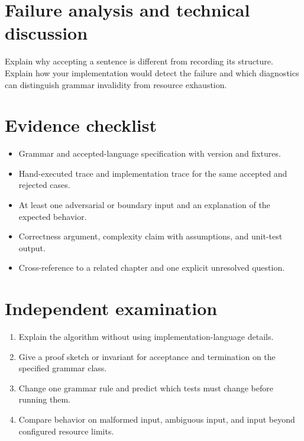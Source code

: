 \documentclass[11pt,letterpaper]{article}
\begin{document}
\section{Failure analysis and technical discussion}
Explain why accepting a sentence is different from recording its structure. Explain how your implementation would detect the failure and which diagnostics can distinguish grammar invalidity from resource exhaustion.
\section{Evidence checklist}
\begin{itemize}
\item Grammar and accepted-language specification with version and fixtures.
\item Hand-executed trace and implementation trace for the same accepted and rejected cases.
\item At least one adversarial or boundary input and an explanation of the expected behavior.
\item Correctness argument, complexity claim with assumptions, and unit-test output.
\item Cross-reference to a related chapter and one explicit unresolved question.
\end{itemize}
\section{Independent examination}
\begin{enumerate}
\item Explain the algorithm without using implementation-language details.
\item Give a proof sketch or invariant for acceptance and termination on the specified grammar class.
\item Change one grammar rule and predict which tests must change before running them.
\item Compare behavior on malformed input, ambiguous input, and input beyond configured resource limits.
\end{enumerate}
\end{document}
